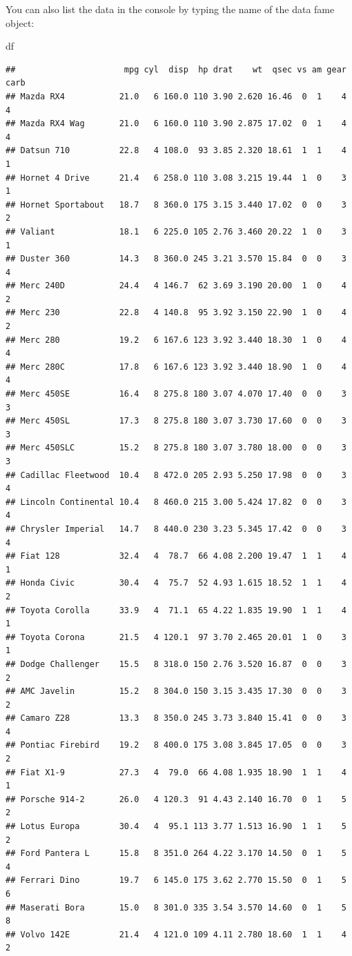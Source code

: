 \documentclass[
]{book}
\newenvironment{Shaded}{\begin{snugshade}}{\end{snugshade}}
\newcommand{\NormalTok}[1]{#1}
\begin{document}
You can also list the data in the console by typing the name of the data fame object:

\begin{Shaded}
\begin{Highlighting}[]
\NormalTok{df}
\end{Highlighting}
\end{Shaded}

\begin{verbatim}
##                      mpg cyl  disp  hp drat    wt  qsec vs am gear carb
## Mazda RX4           21.0   6 160.0 110 3.90 2.620 16.46  0  1    4    4
## Mazda RX4 Wag       21.0   6 160.0 110 3.90 2.875 17.02  0  1    4    4
## Datsun 710          22.8   4 108.0  93 3.85 2.320 18.61  1  1    4    1
## Hornet 4 Drive      21.4   6 258.0 110 3.08 3.215 19.44  1  0    3    1
## Hornet Sportabout   18.7   8 360.0 175 3.15 3.440 17.02  0  0    3    2
## Valiant             18.1   6 225.0 105 2.76 3.460 20.22  1  0    3    1
## Duster 360          14.3   8 360.0 245 3.21 3.570 15.84  0  0    3    4
## Merc 240D           24.4   4 146.7  62 3.69 3.190 20.00  1  0    4    2
## Merc 230            22.8   4 140.8  95 3.92 3.150 22.90  1  0    4    2
## Merc 280            19.2   6 167.6 123 3.92 3.440 18.30  1  0    4    4
## Merc 280C           17.8   6 167.6 123 3.92 3.440 18.90  1  0    4    4
## Merc 450SE          16.4   8 275.8 180 3.07 4.070 17.40  0  0    3    3
## Merc 450SL          17.3   8 275.8 180 3.07 3.730 17.60  0  0    3    3
## Merc 450SLC         15.2   8 275.8 180 3.07 3.780 18.00  0  0    3    3
## Cadillac Fleetwood  10.4   8 472.0 205 2.93 5.250 17.98  0  0    3    4
## Lincoln Continental 10.4   8 460.0 215 3.00 5.424 17.82  0  0    3    4
## Chrysler Imperial   14.7   8 440.0 230 3.23 5.345 17.42  0  0    3    4
## Fiat 128            32.4   4  78.7  66 4.08 2.200 19.47  1  1    4    1
## Honda Civic         30.4   4  75.7  52 4.93 1.615 18.52  1  1    4    2
## Toyota Corolla      33.9   4  71.1  65 4.22 1.835 19.90  1  1    4    1
## Toyota Corona       21.5   4 120.1  97 3.70 2.465 20.01  1  0    3    1
## Dodge Challenger    15.5   8 318.0 150 2.76 3.520 16.87  0  0    3    2
## AMC Javelin         15.2   8 304.0 150 3.15 3.435 17.30  0  0    3    2
## Camaro Z28          13.3   8 350.0 245 3.73 3.840 15.41  0  0    3    4
## Pontiac Firebird    19.2   8 400.0 175 3.08 3.845 17.05  0  0    3    2
## Fiat X1-9           27.3   4  79.0  66 4.08 1.935 18.90  1  1    4    1
## Porsche 914-2       26.0   4 120.3  91 4.43 2.140 16.70  0  1    5    2
## Lotus Europa        30.4   4  95.1 113 3.77 1.513 16.90  1  1    5    2
## Ford Pantera L      15.8   8 351.0 264 4.22 3.170 14.50  0  1    5    4
## Ferrari Dino        19.7   6 145.0 175 3.62 2.770 15.50  0  1    5    6
## Maserati Bora       15.0   8 301.0 335 3.54 3.570 14.60  0  1    5    8
## Volvo 142E          21.4   4 121.0 109 4.11 2.780 18.60  1  1    4    2
\end{verbatim}
\end{document}
